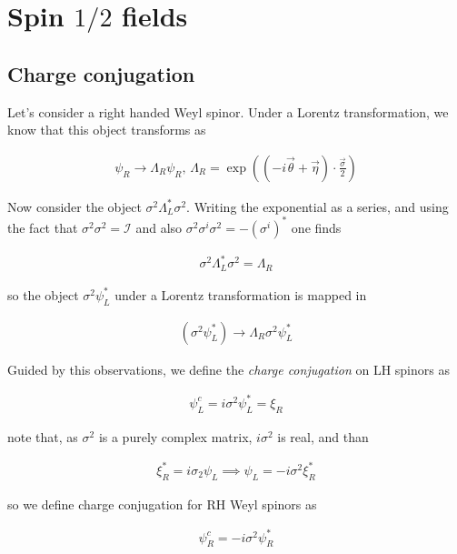 \documentclass{report}
\begin{document}
\chapter{Spin \(1/2\) fields}

\section{Charge conjugation}

Let's consider a right handed Weyl spinor. Under a Lorentz transformation, we know that this object transforms as 

\begin{align}
    \psi_R \rightarrow \Lambda_R \psi_R, \, \Lambda_R = \exp{\left((-i\vec{\theta}+\vec{\eta})\cdot \frac{\vec{\sigma}}{2}\right)}
\end{align}

Now consider the object \(\sigma^2 \Lambda_L^*\sigma^2\). Writing the exponential as a series, and using the fact that \(\sigma^2\sigma^2 = \mathcal{I}\) and also \(\sigma^2 \sigma^i \sigma^2 = -(\sigma^i)^*\) one finds 

\begin{align}
    \sigma^2\Lambda_L^*\sigma^2 = \Lambda_R
\end{align}

so the object \(\sigma^2\psi_L^*\) under a Lorentz transformation is mapped in 

\begin{align}
    (\sigma^2\psi^*_L) \rightarrow \Lambda_R \sigma^2 \psi^*_L
\end{align}

Guided by this observations, we define the \emph{charge conjugation} on LH spinors as 

\begin{align}
    \psi_L^c = i\sigma^2 \psi_L^* = \xi_R
\end{align}

note that, as \(\sigma^2\) is a purely complex matrix, \(i\sigma^2\) is real, and than 

\begin{align}
    \xi^*_R = i\sigma_2 \psi_L \implies \psi_L = -i\sigma^2 \xi_R^*
\end{align}

so we define charge conjugation for RH Weyl spinors as 

\begin{align}
    \psi_R^c = -i\sigma^2 \psi_R^*
\end{align}
\end{document}
